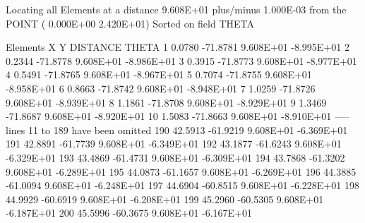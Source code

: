  Locating all Elements at a distance  9.608E+01 plus/minus  1.000E-03
 from the POINT
 (  0.000E+00  2.420E+01)
 Sorted on field THETA


  Elements    X         Y         DISTANCE     THETA
         1    0.0780  -71.8781   9.608E+01  -8.995E+01
         2    0.2344  -71.8778   9.608E+01  -8.986E+01
         3    0.3915  -71.8773   9.608E+01  -8.977E+01
         4    0.5491  -71.8765   9.608E+01  -8.967E+01
         5    0.7074  -71.8755   9.608E+01  -8.958E+01
         6    0.8663  -71.8742   9.608E+01  -8.948E+01
         7    1.0259  -71.8726   9.608E+01  -8.939E+01
         8    1.1861  -71.8708   9.608E+01  -8.929E+01
         9    1.3469  -71.8687   9.608E+01  -8.920E+01
        10    1.5083  -71.8663   9.608E+01  -8.910E+01
----- lines 11 to 189 have been omitted
       190   42.5913  -61.9219   9.608E+01  -6.369E+01
       191   42.8891  -61.7739   9.608E+01  -6.349E+01
       192   43.1877  -61.6243   9.608E+01  -6.329E+01
       193   43.4869  -61.4731   9.608E+01  -6.309E+01
       194   43.7868  -61.3202   9.608E+01  -6.289E+01
       195   44.0873  -61.1657   9.608E+01  -6.269E+01
       196   44.3885  -61.0094   9.608E+01  -6.248E+01
       197   44.6904  -60.8515   9.608E+01  -6.228E+01
       198   44.9929  -60.6919   9.608E+01  -6.208E+01
       199   45.2960  -60.5305   9.608E+01  -6.187E+01
       200   45.5996  -60.3675   9.608E+01  -6.167E+01
